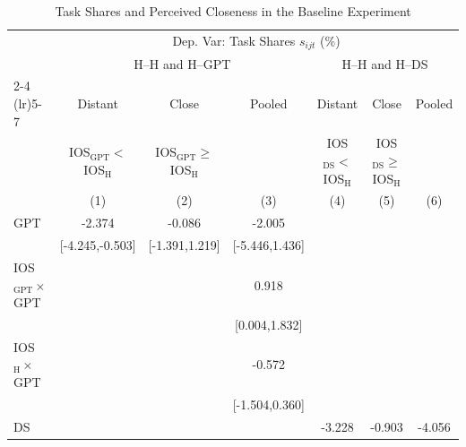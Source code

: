 \begin{table}[H]
\centering
\caption{Task Shares and Perceived Closeness in the Baseline Experiment}
\footnotesize
\begin{threeparttable}
\begin{tabular}{l*{6}{c}}
\toprule\toprule
& \multicolumn{6}{c}{Dep. Var: Task Shares $s_{ijt}$ (\%)} \\
& \multicolumn{3}{c}{H--H and H--GPT} & \multicolumn{3}{c}{H--H and H--DS} \\
\cmidrule(lr){2-4} \cmidrule(lr){5-7}
& Distant & Close & Pooled & Distant & Close & Pooled \\
& {\scriptsize IOS$_{\text{GPT}}<$ IOS$_{\text{H}}$} & {\scriptsize IOS$_{\text{GPT}}\geq$ IOS$_{\text{H}}$} & & {\scriptsize IOS$_{\text{DS}}<$ IOS$_{\text{H}}$} & {\scriptsize IOS$_{\text{DS}}\geq$ IOS$_{\text{H}}$} & \\
& (1) & (2) & (3) & (4) & (5) & (6) \\
\midrule
\midrule
GPT         &                -2.374\sym{*}  &                -0.086         &                -2.005         &                               &                               &                               \\
            &       [-4.245,-0.503]         &        [-1.391,1.219]         &        [-5.446,1.436]         &                               &                               &                               \\
\addlinespace
IOS$_{\text{GPT}}\times$ GPT&                               &                               &                 0.918\sym{*}  &                               &                               &                               \\
            &                               &                               &         [0.004,1.832]         &                               &                               &                               \\
\addlinespace
IOS$_{\text{H}}\times$ GPT&                               &                               &                -0.572         &                               &                               &                               \\
            &                               &                               &        [-1.504,0.360]         &                               &                               &                               \\
\addlinespace
DS          &                               &                               &                               &                -3.228\sym{***}&                -0.903         &                -4.056\sym{**} \\

\end{tabular}
\end{threeparttable}
\end{table}

